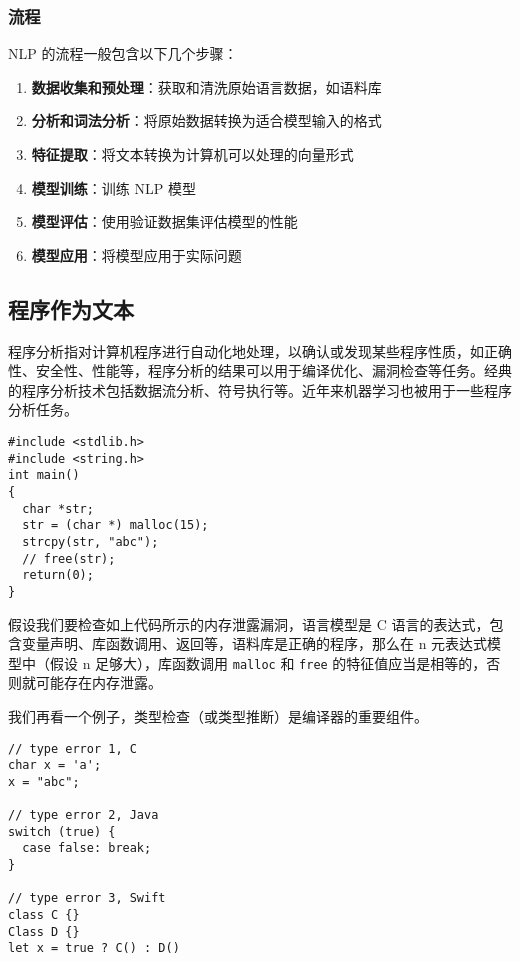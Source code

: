 \subsubsection{流程}

NLP 的流程一般包含以下几个步骤：

\begin{enumerate}
\item \textbf{数据收集和预处理}：获取和清洗原始语言数据，如语料库
\item \textbf{分析和词法分析}：将原始数据转换为适合模型输入的格式
\item \textbf{特征提取}：将文本转换为计算机可以处理的向量形式
\item \textbf{模型训练}：训练 NLP 模型
\item \textbf{模型评估}：使用验证数据集评估模型的性能
\item \textbf{模型应用}：将模型应用于实际问题
\end{enumerate}

\subsection{程序作为文本}

程序分析指对计算机程序进行自动化地处理，以确认或发现某些程序性质，如正确性、安全性、性能等，程序分析的结果可以用于编译优化、漏洞检查等任务。经典的程序分析技术包括数据流分析、符号执行等。近年来机器学习也被用于一些程序分析任务。

\begin{lstlisting}[frame=none,numbers=none]
#include <stdlib.h>
#include <string.h>
int main()
{
  char *str;
  str = (char *) malloc(15);
  strcpy(str, "abc");
  // free(str);
  return(0);
}
\end{lstlisting}

假设我们要检查如上代码所示的内存泄露漏洞，语言模型是 C 语言的表达式，包含变量声明、库函数调用、返回等，语料库是正确的程序，那么在 n 元表达式模型中（假设 n 足够大），库函数调用 \texttt{malloc} 和 \texttt{free} 的特征值应当是相等的，否则就可能存在内存泄露。

我们再看一个例子，类型检查（或类型推断）是编译器的重要组件。

\begin{lstlisting}[frame=none,numbers=none]
// type error 1, C
char x = 'a';
x = "abc";

// type error 2, Java
switch (true) {
  case false: break;
}

// type error 3, Swift
class C {}
Class D {}
let x = true ? C() : D()
\end{lstlisting}

